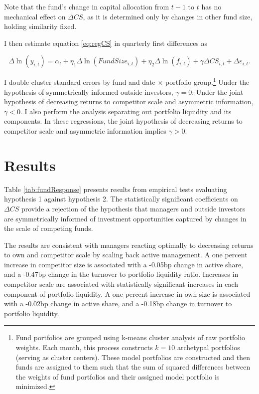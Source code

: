 \documentclass[openany]{book}
\let\rmarkdownfootnote\footnote%
\def\footnote{\protect\rmarkdownfootnote}
\theoremstyle{definition}
\theoremstyle{definition}
\theoremstyle{definition}
\theoremstyle{remark}
\begin{document}
Note that the fund's change in capital allocation from \(t-1\) to \(t\)
has no mechanical effect on \(\Delta CS\), as it is determined only by
changes in other fund size, holding similarity fixed.

I then estimate equation \eqref{eq:regCS} in quarterly first differences
as

\begin{equation}
\Delta\ln(y_{i,t})=\alpha_t + \eta_1 \Delta\ln(FundSize_{i,t}) +\eta_2 \Delta\ln(f_{i,t}) + \gamma\Delta CS_{i,t} + \Delta\varepsilon_{i,t}.
\label{eq:fdReg}
\end{equation}

I double cluster standard errors by fund and date \(\times\) portfolio
group.\footnote{
Fund portfolios are grouped using k-means cluster analysis of raw portfolio weights. Each month, this process constructs $k=10$ archetypal portfolios (serving as cluster centers). These model portfolios are constructed and then funds are assigned to them such that the sum of squared differences between the weights of fund portfolios and their assigned model portfolio is minimized.
} Under the hypothesis of symmetrically informed outside investors,
\(\gamma=0\). Under the joint hypothesis of decreasing returns to
competitor scale and asymmetric information, \(\gamma<0\). I also
perform the analysis separating out portfolio liquidity and its
components. In these regressions, the joint hypothesis of decreasing
returns to competitor scale and asymmetric information implies
\(\gamma>0\).

\section{Results}\label{results}

Table \ref{tab:fundResponse} presents results from empirical tests
evaluating hypothesis 1 against hypothesis 2. The statistically
significant coefficients on \(\Delta CS\) provide a rejection of the
hypothesis that managers and outside investors are symmetrically
informed of investment opportunities captured by changes in the scale of
competing funds.

The results are consistent with managers reacting optimally to
decreasing returns to own and competitor scale by scaling back active
management. A one percent increase in competitor size is associated with
a -0.05bp change in active share, and a -0.47bp change in the turnover
to portfolio liquidity ratio. Increases in competitor scale are
associated with statistically significant increases in each component of
portfolio liquidity. A one percent increase in own size is associated
with a -0.02bp change in active share, and a -0.18bp change in turnover
to portfolio liquidity.
\end{document}
